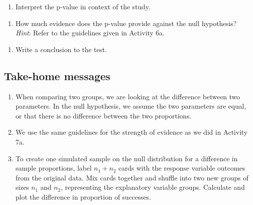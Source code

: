 \documentclass[
]{report}
\providecommand{\tightlist}{%
  \setlength{\itemsep}{0pt}\setlength{\parskip}{0pt}}
\begin{document}
\vspace{0.2in}
\newpage

\begin{enumerate}
\def\labelenumi{\arabic{enumi}.}
\setcounter{enumi}{19}
\tightlist
\item
  Interpret the p-value in context of the study.
\end{enumerate}

\vspace{1in}

\begin{enumerate}
\def\labelenumi{\arabic{enumi}.}
\setcounter{enumi}{20}
\tightlist
\item
  How much evidence does the p-value provide against the null hypothesis? \emph{Hint}: Refer to the guidelines given in Activity 6a.
\end{enumerate}

\vspace{0.4in}

\begin{enumerate}
\def\labelenumi{\arabic{enumi}.}
\setcounter{enumi}{21}
\tightlist
\item
  Write a conclusion to the test.
\end{enumerate}

\vspace{1in}

\hypertarget{take-home-messages-11}{%
\subsection{Take-home messages}\label{take-home-messages-11}}

\begin{enumerate}
\def\labelenumi{\arabic{enumi}.}
\item
  When comparing two groups, we are looking at the difference between two parameters. In the null hypothesis, we assume the two parameters are equal, or that there is no difference between the two proportions.
\item
  We use the same guidelines for the strength of evidence as we did in Activity 7a.
\item
  To create one simulated sample on the null distribution for a difference in sample proportions, label \(n_1 + n_2\) cards with the response variable outcomes from the original data. Mix cards together and shuffle into two new groups of sizes \(n_1\) and \(n_2\), representing the explanatory variable groups. Calculate and plot the difference in proportion of successes.
\end{enumerate}
\end{document}
